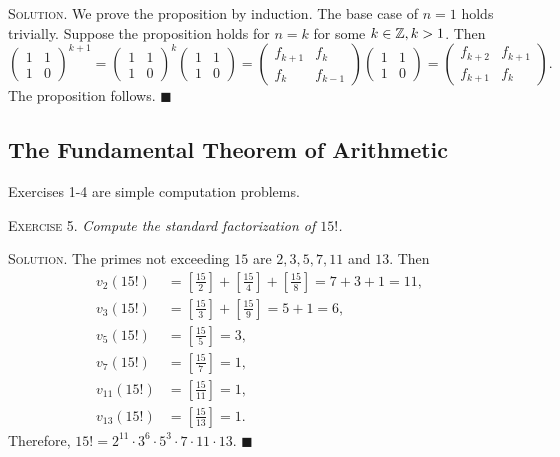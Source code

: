 \documentclass[11pt, leqno]{article}
\newcommand{\done}{\ensuremath{\blacksquare}}
\begin{document}
\textsc{Solution}. We prove the proposition by induction. The base case of $n=1$ holds trivially. Suppose the proposition holds for $n=k$ for some $k\in\mathbb{Z}, k>1$. Then 
\begin{displaymath}
\begin{pmatrix} 1 & 1 \\ 1 & 0 \end{pmatrix}^{k+1} = \begin{pmatrix} 1 & 1 \\ 1 & 0 \end{pmatrix}^k \begin{pmatrix} 1 & 1 \\ 1 & 0 \end{pmatrix} = \begin{pmatrix} f_{k+1} & f_k \\ f_k & f_{k-1} \end{pmatrix} \begin{pmatrix} 1 & 1 \\ 1 & 0 \end{pmatrix} = \begin{pmatrix} f_{k+2} & f_{k+1} \\ f_{k+1} & f_k \end{pmatrix}.
\end{displaymath}
The proposition follows. \done

\subsection{The Fundamental Theorem of Arithmetic}

Exercises 1-4 are simple computation problems.

\textsc{Exercise 5}. \emph{Compute the standard factorization of $15!$.}

\textsc{Solution}. The primes not exceeding $15$ are $2, 3, 5, 7, 11 $ and $13$. Then 
\begin{align*}
  v_2(15!) &= \left[\frac{15}{2}\right] + \left[\frac{15}{4}\right] + \left[\frac{15}{8}\right] = 7 + 3 + 1 = 11, \\
  v_3(15!) &= \left[\frac{15}{3}\right] + \left[\frac{15}{9}\right] = 5 + 1 = 6,\\
  v_5(15!) &= \left[\frac{15}{5}\right] = 3, \\
  v_7(15!) &= \left[\frac{15}{7}\right] = 1, \\
  v_{11}(15!) &= \left[\frac{15}{11}\right] = 1, \\
  v_{13}(15!) &= \left[\frac{15}{13}\right] = 1.
\end{align*}
Therefore, $15! = 2^{11}\cdot 3^6\cdot 5^3\cdot 7 \cdot 11 \cdot 13$. \done
\end{document}
